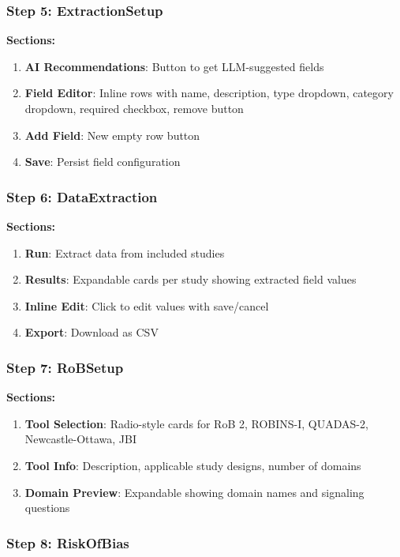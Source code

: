 \documentclass[11pt,a4paper]{article}
\begin{document}
\subsubsection{Step 5: ExtractionSetup}

\textbf{Sections:}
\begin{enumerate}[nosep]
  \item \textbf{AI Recommendations}: Button to get LLM-suggested fields
  \item \textbf{Field Editor}: Inline rows with name, description, type dropdown, category dropdown, required checkbox, remove button
  \item \textbf{Add Field}: New empty row button
  \item \textbf{Save}: Persist field configuration
\end{enumerate}

\subsubsection{Step 6: DataExtraction}

\textbf{Sections:}
\begin{enumerate}[nosep]
  \item \textbf{Run}: Extract data from included studies
  \item \textbf{Results}: Expandable cards per study showing extracted field values
  \item \textbf{Inline Edit}: Click to edit values with save/cancel
  \item \textbf{Export}: Download as CSV
\end{enumerate}

\subsubsection{Step 7: RoBSetup}

\textbf{Sections:}
\begin{enumerate}[nosep]
  \item \textbf{Tool Selection}: Radio-style cards for RoB 2, ROBINS-I, QUADAS-2, Newcastle-Ottawa, JBI
  \item \textbf{Tool Info}: Description, applicable study designs, number of domains
  \item \textbf{Domain Preview}: Expandable showing domain names and signaling questions
\end{enumerate}

\subsubsection{Step 8: RiskOfBias}
\end{document}
